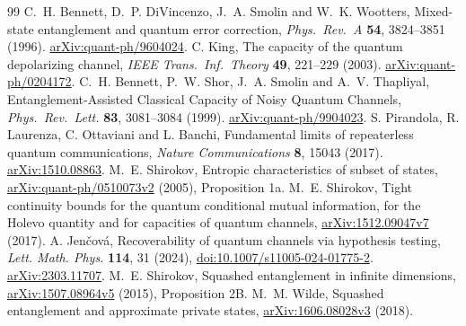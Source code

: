 \documentclass[11pt]{article}
\begin{document}
\begin{thebibliography}{99}
 C.~H. Bennett, D.~P. DiVincenzo, J.~A. Smolin and
W.~K. Wootters, Mixed-state entanglement and quantum error correction,
\emph{Phys.\ Rev.\ A} \textbf{54}, 3824--3851 (1996).
\href{https://arxiv.org/abs/quant-ph/9604024}{arXiv:quant-ph/9604024}.
 C. King, The capacity of the quantum depolarizing channel,
\emph{IEEE Trans.\ Inf.\ Theory} \textbf{49}, 221--229 (2003).
\href{https://arxiv.org/abs/quant-ph/0204172}{arXiv:quant-ph/0204172}.
 C.~H. Bennett, P.~W. Shor, J.~A. Smolin and
A.~V. Thapliyal, Entanglement-Assisted Classical Capacity of Noisy
Quantum Channels, \emph{Phys.\ Rev.\ Lett.} \textbf{83}, 3081--3084 (1999).
\href{https://arxiv.org/abs/quant-ph/9904023}{arXiv:quant-ph/9904023}.
 S. Pirandola, R. Laurenza, C. Ottaviani and L. Banchi,
Fundamental limits of repeaterless quantum communications,
\emph{Nature Communications} \textbf{8}, 15043 (2017).
\href{https://arxiv.org/abs/1510.08863}{arXiv:1510.08863}.
 M.~E. Shirokov,
Entropic characteristics of subset of states,
\href{https://arxiv.org/abs/quant-ph/0510073v2}{arXiv:quant-ph/0510073v2}
(2005), Proposition 1a.
 M.~E. Shirokov,
Tight continuity bounds for the quantum conditional mutual information,
for the Holevo quantity and for capacities of quantum channels,
\href{https://arxiv.org/abs/1512.09047v7}{arXiv:1512.09047v7} (2017).
 A. Jen\v{c}ov\'a,
Recoverability of quantum channels via hypothesis testing,
\emph{Lett. Math. Phys.} \textbf{114}, 31 (2024),
\href{https://doi.org/10.1007/s11005-024-01775-2}{doi:10.1007/s11005-024-01775-2}.
\href{https://arxiv.org/abs/2303.11707}{arXiv:2303.11707}.
 M.~E. Shirokov,
Squashed entanglement in infinite dimensions,
\href{https://arxiv.org/abs/1507.08964v5}{arXiv:1507.08964v5} (2015),
Proposition 2B.
 M.~M. Wilde,
Squashed entanglement and approximate private states,
\href{https://arxiv.org/abs/1606.08028v3}{arXiv:1606.08028v3} (2018).

\end{thebibliography}
\end{document}
